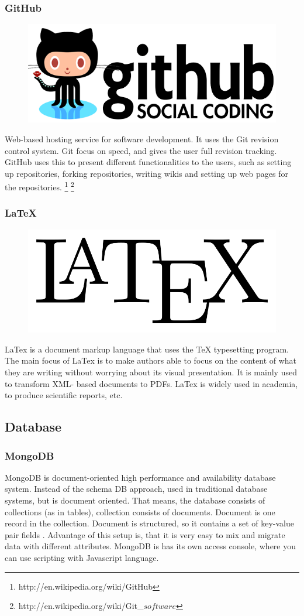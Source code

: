 \subsubsection{GitHub}

\begin{figure}
\vspace{-30pt}
\centering
\includegraphics[width = .20\textwidth]{image/github-logo.png}
\end{figure}

Web-based hosting service for software development. It uses the Git revision control system. Git focus on speed, and gives the user full revision tracking. GitHub uses this to present different functionalities to the users, such as setting up repositories, forking repositories, writing wikis and setting up web pages for the repositories.
\footnote{http://en.wikipedia.org/wiki/GitHub}
\footnote{http://en.wikipedia.org/wiki/Git\_\(software\)}

\subsubsection{LaTeX}

\begin{figure}
\vspace{-30pt}
\centering
\includegraphics[width = .20\textwidth]{image/latex-logo.png}
\end{figure}

LaTex is a document markup language that uses the TeX typesetting program. The main focus of LaTex is to make authors able to focus on the content of what they are writing without worrying about its visual presentation. It is mainly used to transform XML- based documents to PDFs. LaTex is widely used in academia, to produce scientific reports, etc.

\subsection{Database}
\subsubsection*{MongoDB}
MongoDB is document-oriented high performance and availability database system. Instead of the schema DB approach, used in traditional database systems, but is document oriented. That means, the database consists of collections (as in tables), collection consists of documents. Document is one record in the collection. Document is structured, so it contains a set of key-value pair fields \cite{mongodb-intro}. Advantage of this setup is, that it is very easy to mix and migrate data with different attributes. MongoDB is has its own access console, where you can use scripting with Javascript language. 

